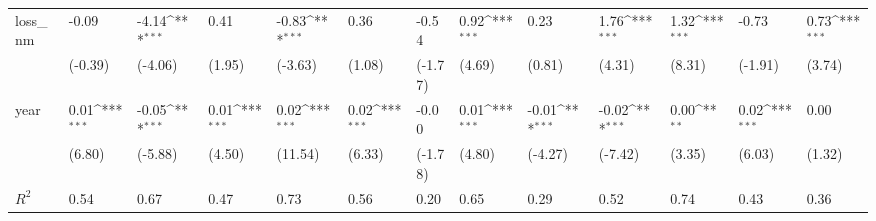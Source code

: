 \def\sym#1{\ifmmode^{#1}\else\(^{#1}\)\fi}
\begin{tabular}{p{1.5cm} p{1.7cm} p{1.7cm} p{1.7cm}  p{1.7cm} p{1.7cm} p{1.7cm} p{1.7cm} p{1.7cm}  p{1.7cm} p{1.7cm} p{1.7cm} p{1.7cm} }
\hline
loss\_nm         &    -0.09         &    -4.14\sym{***}&     0.41         &    -0.83\sym{***}&     0.36         &    -0.54         &     0.92\sym{***}&     0.23         &     1.76\sym{***}&     1.32\sym{***}&    -0.73         &     0.73\sym{***}\\
                &  (-0.39)         &  (-4.06)         &   (1.95)         &  (-3.63)         &   (1.08)         &  (-1.77)         &   (4.69)         &   (0.81)         &   (4.31)         &   (8.31)         &  (-1.91)         &   (3.74)         \\
year            &     0.01\sym{***}&    -0.05\sym{***}&     0.01\sym{***}&     0.02\sym{***}&     0.02\sym{***}&    -0.00         &     0.01\sym{***}&    -0.01\sym{***}&    -0.02\sym{***}&     0.00\sym{**} &     0.02\sym{***}&     0.00         \\
                &   (6.80)         &  (-5.88)         &   (4.50)         &  (11.54)         &   (6.33)         &  (-1.78)         &   (4.80)         &  (-4.27)         &  (-7.42)         &   (3.35)         &   (6.03)         &   (1.32)         \\
\hline
\(R^{2}\)       &     0.54         &     0.67         &     0.47         &     0.73         &     0.56         &     0.20         &     0.65         &     0.29         &     0.52         &     0.74         &     0.43         &     0.36         \\
\end{tabular}
\def\sym#1{\ifmmode^{#1}\else\(^{#1}\)\fi}
